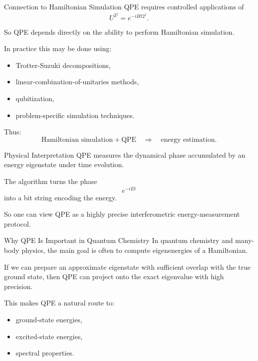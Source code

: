 \documentclass{beamer}
\begin{document}
\begin{frame}{Connection to Hamiltonian Simulation}
QPE requires controlled applications of
\[
U^{2^j} = e^{-iH t 2^j}.
\]

So QPE depends directly on the ability to perform Hamiltonian simulation.

In practice this may be done using:
\begin{itemize}
\item Trotter-Suzuki decompositions,
\item linear-combination-of-unitaries methods,
\item qubitization,
\item problem-specific simulation techniques.
\end{itemize}

Thus:
\[
\text{Hamiltonian simulation} + \text{QPE}
\quad \Rightarrow \quad
\text{energy estimation}.
\]
\end{frame}

\begin{frame}{Physical Interpretation}
QPE measures the dynamical phase accumulated by an energy eigenstate under time evolution.

The algorithm turns the phase
\[
e^{-iEt}
\]
into a bit string encoding the energy.

So one can view QPE as a highly precise interferometric energy-measurement protocol.
\end{frame}

\begin{frame}{Why QPE Is Important in Quantum Chemistry}
In quantum chemistry and many-body physics, the main goal is often to compute eigenenergies of a Hamiltonian.

If we can prepare an approximate eigenstate with sufficient overlap with the true ground state, then QPE can project onto the exact eigenvalue with high precision.

This makes QPE a natural route to:
\begin{itemize}
\item ground-state energies,
\item excited-state energies,
\item spectral properties.
\end{itemize}
\end{frame}
\end{document}
